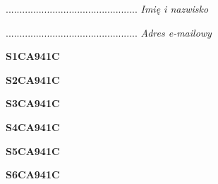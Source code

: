 \begin{turn}{90}\begin{minipage}{\linewidth} \vspace{20mm} ................................................  \textit{Imię i nazwisko}\end{minipage}\end{turn}

\begin{turn}{90}\begin{minipage}{\linewidth} \vspace{20mm} ................................................  \textit{Adres e-mailowy}\end{minipage}\end{turn}

\begin{turn}{90}\huge \begin{minipage}{\linewidth} \vspace{10mm}\textbf{S1CA941C}\end{minipage}\end{turn}

\begin{turn}{90}\huge \begin{minipage}{\linewidth} \vspace{10mm}\textbf{S2CA941C}\end{minipage}\end{turn}

\begin{turn}{90}\huge \begin{minipage}{\linewidth} \vspace{10mm}\textbf{S3CA941C}\end{minipage}\end{turn}

\begin{turn}{90}\huge \begin{minipage}{\linewidth} \vspace{10mm}\textbf{S4CA941C}\end{minipage}\end{turn}

\begin{turn}{90}\huge \begin{minipage}{\linewidth} \vspace{10mm}\textbf{S5CA941C}\end{minipage}\end{turn}

\begin{turn}{90}\huge \begin{minipage}{\linewidth} \vspace{10mm}\textbf{S6CA941C}\end{minipage}\end{turn}

